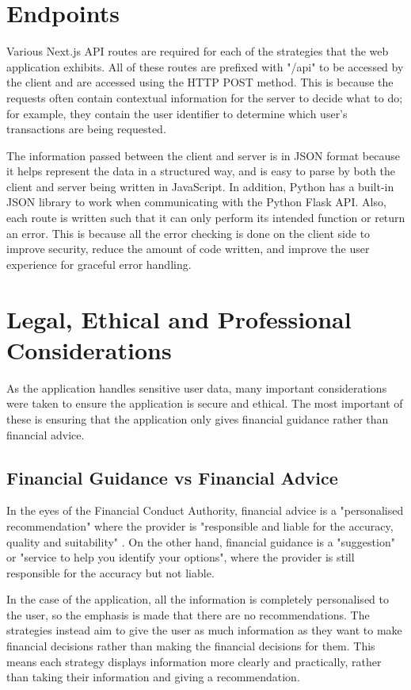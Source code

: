 \section{Endpoints}
\label{sec:endpoints}
Various Next.js API routes are required for each of the strategies that the web application exhibits. All of these routes are prefixed with "/api" to be accessed by the client and are accessed using the HTTP POST method. This is because the requests often contain contextual information for the server to decide what to do; for example, they contain the user identifier to determine which user's transactions are being requested. 

The information passed between the client and server is in JSON format because it helps represent the data in a structured way, and is easy to parse by both the client and server being written in JavaScript. In addition, Python has a built-in JSON library to work when communicating with the Python Flask API. Also, each route is written such that it can only perform its intended function or return an error. This is because all the error checking is done on the client side to improve security, reduce the amount of code written, and improve the user experience for graceful error handling.

\section{Legal, Ethical and Professional Considerations}
As the application handles sensitive user data, many important considerations were taken to ensure the application is secure and ethical. The most important of these is ensuring that the application only gives financial guidance rather than financial advice.

\subsection{Financial Guidance vs Financial Advice}
In the eyes of the Financial Conduct Authority, financial advice is a "personalised recommendation" where the provider is "responsible and liable for the accuracy, quality and suitability" \cite{FCA}. On the other hand, financial guidance is a "suggestion" or "service to help you identify your options", where the provider is still responsible for the accuracy but not liable.

In the case of the application, all the information is completely personalised to the user, so the emphasis is made that there are no recommendations. The strategies instead aim to give the user as much information as they want to make financial decisions rather than making the financial decisions for them. This means each strategy displays information more clearly and practically, rather than taking their information and giving a recommendation.


